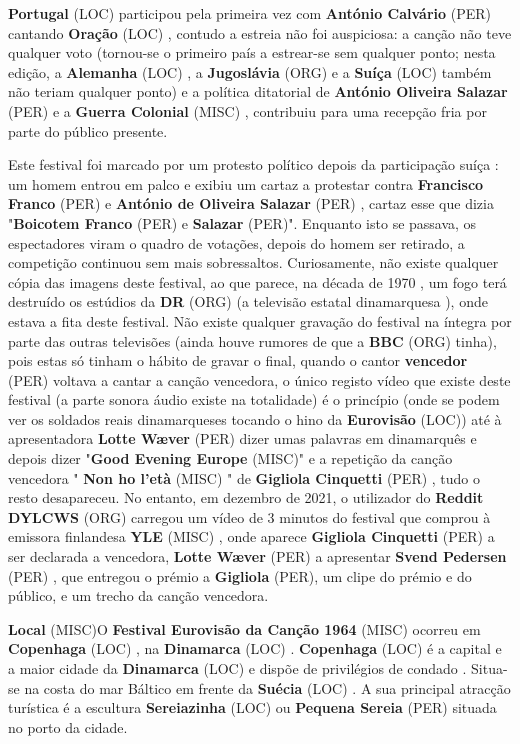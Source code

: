 \documentclass[12pt,a4paper]{article}
\begin{document}
\textbf{Portugal} (LOC) participou pela primeira vez com \textbf{António Calvário} (PER) cantando \textbf{Oração} (LOC) , contudo a estreia não foi auspiciosa: a canção não teve qualquer voto (tornou-se o primeiro país a estrear-se sem qualquer ponto; nesta edição, a \textbf{Alemanha} (LOC) , a \textbf{Jugoslávia} (ORG) e a \textbf{Suíça} (LOC) também não teriam qualquer ponto) e a política ditatorial de \textbf{António Oliveira Salazar} (PER) e a \textbf{Guerra Colonial} (MISC) , contribuiu para uma recepção fria por parte do público presente.

Este festival foi marcado por um protesto político depois da participação suíça : um homem entrou em palco e exibiu um cartaz a protestar contra \textbf{Francisco Franco} (PER) e \textbf{António de Oliveira Salazar} (PER) , cartaz esse que dizia "\textbf{Boicotem Franco} (PER) e \textbf{Salazar} (PER)". Enquanto isto se passava, os espectadores viram o quadro de votações, depois do homem ser retirado, a competição continuou sem mais sobressaltos. Curiosamente, não existe qualquer cópia das imagens deste festival, ao que parece, na década de 1970 , um fogo terá destruído os estúdios da \textbf{DR} (ORG) (a televisão estatal dinamarquesa ), onde estava a fita deste festival. Não existe qualquer gravação do festival na íntegra por parte das outras televisões (ainda houve rumores de que a \textbf{BBC} (ORG) tinha), pois estas só tinham o hábito de gravar o final, quando o cantor \textbf{vencedor} (PER) voltava a cantar a canção vencedora, o único registo vídeo que existe deste festival (a parte sonora áudio existe na totalidade) é o princípio (onde se podem ver os soldados reais dinamarqueses tocando o hino da \textbf{Eurovisão} (LOC)) até à apresentadora \textbf{Lotte Wæver} (PER) dizer umas palavras em dinamarquês e depois dizer "\textbf{Good Evening Europe} (MISC)" e a repetição da canção vencedora " \textbf{Non ho l'età} (MISC) " de \textbf{Gigliola Cinquetti} (PER) , tudo o resto desapareceu. No entanto, em dezembro de 2021, o utilizador do \textbf{Reddit DYLCWS} (ORG) carregou um vídeo de 3 minutos do festival que comprou à emissora finlandesa \textbf{YLE} (MISC) , onde aparece \textbf{Gigliola Cinquetti} (PER) a ser declarada a vencedora, \textbf{Lotte Wæver} (PER) a apresentar \textbf{Svend Pedersen} (PER) , que entregou o prémio a \textbf{Gigliola} (PER), um clipe do prémio e do público, e um trecho da canção vencedora.



\textbf{Local} (MISC)O \textbf{Festival Eurovisão da Canção 1964} (MISC) ocorreu em \textbf{Copenhaga} (LOC) , na \textbf{Dinamarca} (LOC) . \textbf{Copenhaga} (LOC) é a capital e a maior cidade da \textbf{Dinamarca} (LOC) e dispõe de privilégios de condado . Situa-se na costa do mar Báltico em frente da \textbf{Suécia} (LOC) . A sua principal atracção turística é a escultura \textbf{Sereiazinha} (LOC) ou \textbf{Pequena Sereia} (PER) situada no porto da cidade.
\end{document}
